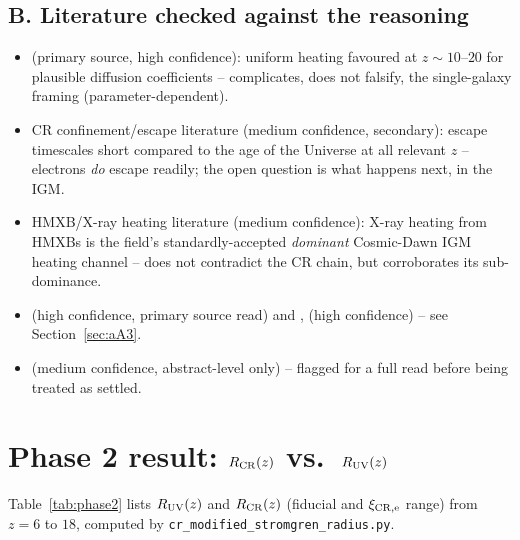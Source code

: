 \documentclass[11pt,a4paper]{article}
\begin{document}
\subsection{B. Literature checked against the reasoning}
\label{sec:planB}
\begin{itemize}
\item \citet{Jana2018} (primary source, high confidence): uniform heating favoured at
      $z\sim10$--$20$ for plausible diffusion coefficients -- complicates, does not falsify,
      the single-galaxy framing (parameter-dependent).
\item CR confinement/escape literature (medium confidence, secondary): escape timescales
      short compared to the age of the Universe at all relevant $z$ -- electrons \emph{do}
      escape readily; the open question is what happens next, in the IGM.
\item HMXB/X-ray heating literature (medium confidence): X-ray heating from HMXBs is the
      field's standardly-accepted \emph{dominant} Cosmic-Dawn IGM heating channel -- does not
      contradict the CR chain, but corroborates its sub-dominance.
\item \citet{Cummings2016Voyager} (high confidence, primary source read) and
      \citet{Blasi2013}, \citet{Park2015} (high confidence) -- see Section~\ref{sec:aA3}.
\item \citet{ElectronInjectionThreshold2025} (medium confidence, abstract-level only) --
      flagged for a full read before being treated as settled.
\end{itemize}

\section{Phase 2 result: $R_{\rm CR}(z)$ vs.\ $R_{\rm UV}(z)$}
\label{sec:phase2}

Table~\ref{tab:phase2} lists $R_{\rm UV}(z)$ and $R_{\rm CR}(z)$ (fiducial and
$\xi_{\rm CR,e}$ range) from $z=6$ to $18$, computed by
\texttt{cr\_modified\_stromgren\_radius.py}.
\end{document}
